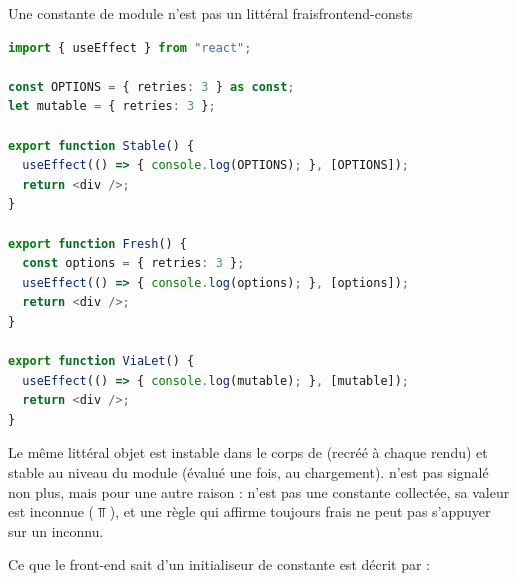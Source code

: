\begin{exemple}{Une constante de module n'est pas un littéral frais}{frontend-consts}
\begin{lstlisting}[language=TypeScript,caption={\file{/tmp/ch05/consts/Consts.tsx}}]
import { useEffect } from "react";

const OPTIONS = { retries: 3 } as const;
let mutable = { retries: 3 };

export function Stable() {
  useEffect(() => { console.log(OPTIONS); }, [OPTIONS]);
  return <div />;
}

export function Fresh() {
  const options = { retries: 3 };
  useEffect(() => { console.log(options); }, [options]);
  return <div />;
}

export function ViaLet() {
  useEffect(() => { console.log(mutable); }, [mutable]);
  return <div />;
}
\end{lstlisting}
Le même littéral objet est instable dans le corps de  (recréé à chaque rendu) et stable au niveau du module (évalué une fois, au chargement).  n'est pas signalé non plus, mais pour une autre raison :  n'est pas une constante collectée, sa valeur est inconnue ($\Top$), et une règle \Warning{} qui affirme \og toujours frais\fg{} ne peut pas s'appuyer sur un inconnu.
\end{exemple}

Ce que le front-end sait d'un initialiseur de constante est décrit par :


